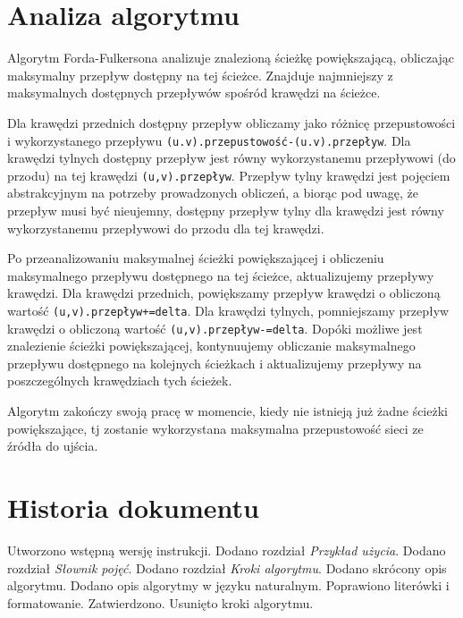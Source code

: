 \documentclass[10pt]{dokument-tiwo}
\begin{document}
\section{Analiza algorytmu}
\label{sec:analiza}

Algorytm Forda-Fulkersona analizuje znalezioną ścieżkę powiększającą, obliczając
maksymalny przepływ dostępny na tej ścieżce. Znajduje najmniejszy z maksymalnych
dostępnych przepływów spośród krawędzi na ścieżce.

Dla krawędzi przednich dostępny przepływ obliczamy jako różnicę przepustowości i
wykorzystanego przepływu \texttt{(u.v).przepustowość-(u.v).przepływ}. Dla
krawędzi tylnych dostępny przepływ jest równy wykorzystanemu przepływowi (do
przodu) na tej krawędzi \texttt{(u,v).przepływ}. Przepływ tylny krawędzi jest
pojęciem abstrakcyjnym na potrzeby prowadzonych obliczeń, a biorąc pod uwagę, że
przepływ musi być nieujemny, dostępny przepływ tylny dla krawędzi jest równy
wykorzystanemu przepływowi do przodu dla tej krawędzi.

Po przeanalizowaniu maksymalnej ścieżki powiększającej i obliczeniu maksymalnego
przepływu dostępnego na tej ścieżce, aktualizujemy przepływy krawędzi. Dla
krawędzi przednich, powiększamy przepływ krawędzi o obliczoną wartość
\texttt{(u,v).przepływ+=delta}. Dla krawędzi tylnych, pomniejszamy przepływ
krawędzi o obliczoną wartość \texttt{(u,v).przepływ-=delta}. Dopóki możliwe jest
znalezienie ścieżki powiększającej, kontynuujemy obliczanie maksymalnego
przepływu dostępnego na kolejnych ścieżkach i aktualizujemy przepływy na
poszczególnych krawędziach tych ścieżek.

Algorytm zakończy swoją pracę w momencie, kiedy nie istnieją już żadne ścieżki
powiększające, tj zostanie wykorzystana maksymalna przepustowość sieci ze źródła
do ujścia.


\section{Historia dokumentu}
\begin{versions}
        Utworzono wstępną wersję instrukcji.
        Dodano rozdział \emph{Przykład użycia}.
        Dodano rozdział \emph{Słownik pojęć}.
        Dodano rozdział \emph{Kroki algorytmu}.
        Dodano skrócony opis algorytmu. Dodano opis algorytmy w języku
        naturalnym.
        Poprawiono literówki i formatowanie.
        Zatwierdzono.
        Usunięto kroki algorytmu.
\end{versions}
\end{document}
